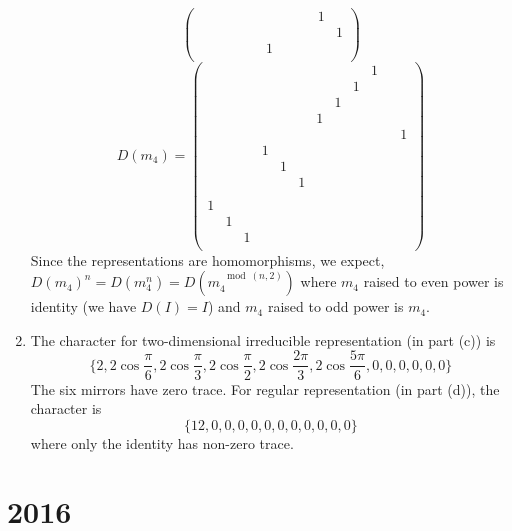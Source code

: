 \documentclass[a4paper]{article}
\begin{document}
\begin{ans}
\begin{enumerate}[label=(\alph*)]
$$\begin{pmatrix}
& & & & & & & & & &1 &\\
& & & & & & & & & & &1\\
& & & & & &1 & & & & &\\
\end{pmatrix}$$
$$D(m_4)=\begin{pmatrix}
& & & & & & & & &1& &\\
& & & & & & & &1& & &\\
& & & & & & &1& & & &\\
& & & & & &1& & & & &\\
& & & & & & & & & & &1\\
& & &1& & & & & & & &\\
& & & &1& & & & & & &\\
& & & & &1& & & & & &\\
& & & & & & & & & & &\\
1& & & & & & & & & & &\\
&1& & & & & & & & & &\\
& &1& & & & & & & & &\\
\end{pmatrix}
$$
Since the representations are homomorphisms, we expect, $D(m_4)^{n}=D(m_4^n)=D(m_4^{\mod(n,2)})$ where $m_4$ raised to even power is identity (we have $D(I)=I$) and $m_4$ raised to odd power is $m_4$. 
\item The character for two-dimensional irreducible representation (in part (c)) is
$$\bigg\{2,2\cos\frac{\pi}{6},2\cos\frac{\pi}{3},2\cos\frac{\pi}{2},2\cos\frac{2\pi}{3},2\cos\frac{5\pi}{6},0,0,0,0,0,0\bigg\}$$
The six mirrors have zero trace. For regular representation (in part (d)), the character is
$$\{12,0,0,0,0,0,0,0,0,0,0,0\}$$
where only the identity has non-zero trace.


\end{enumerate}
\end{ans}
\newpage
\section{2016}
\end{document}
